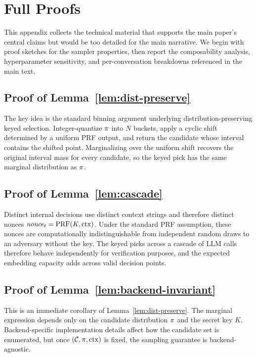 


\section{Full Proofs}
\label{app:proofs}

This appendix collects the technical material that supports the main
paper's central claims but would be too detailed for the main
narrative. We begin with proof sketches for the sampler properties,
then report the composability analysis, hyperparameter sensitivity, and
per-conversation breakdowns referenced in the main text.

\subsection{Proof of Lemma~\ref{lem:dist-preserve}}
The key idea is the standard binning argument underlying
distribution-preserving keyed selection. Integer-quantize
$\pi$ into $N$ buckets, apply a cyclic shift determined by a
uniform PRF output, and return the candidate whose interval contains
the shifted point. Marginalizing over the uniform shift recovers the
original interval mass for every candidate, so the keyed pick has the
same marginal distribution as $\pi$.

\subsection{Proof of Lemma~\ref{lem:cascade}}
Distinct internal decisions use distinct context strings and therefore
distinct nonces $\mathit{nonce}_t = \mathrm{PRF}(K, \mathrm{ctx})$. Under the standard
PRF assumption, these nonces are computationally indistinguishable from
independent random draws to an adversary without the key. The keyed
picks across a cascade of LLM calls therefore behave independently for
verification purposes, and the expected embedding capacity adds across
valid decision points.

\subsection{Proof of Lemma~\ref{lem:backend-invariant}}
This is an immediate corollary of
Lemma~\ref{lem:dist-preserve}. The marginal expression depends only on
the candidate distribution $\pi$ and the secret key $K$.
Backend-specific implementation details affect how the candidate set is
enumerated, but once $(\mathcal{C}, \pi, \mathrm{ctx})$ is fixed, the
sampling guarantee is backend-agnostic.

